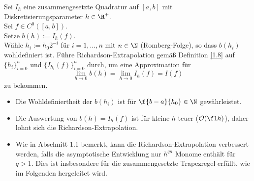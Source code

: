 \documentclass[11pt]{scrbook}
\begin{document}
\begin{df}
	\label{2.33}
	Sei $I_h$ eine zusammengesetzte Quadratur auf $[a,b]$ mit Diskretisierungsparameter $h\in \R^+$.  \\
	Sei $f\in C^0([a,b])$. \\
	Setze $b(h) := I_h(f)$. \\
	Wähle $h_i := h_0 2^{-i}$ für $i=1,\dotsc,n$ mit $n\in \N$ (Romberg-Folge), so dass $b(h_i)$ wohldefiniert ist.
	Führe Richardson-Extrapolation gemäß Definition \ref{1.8} auf $\{h_i\}_{i=0}^n$ und $\{I_{h_i}(f)\}_{i=0}^n$ durch, um eine Approximation für
	\[
		\lim_{h\to 0} b(h) = \lim_{h\to 0} I_h(f) = I(f)
	\]
	zu bekommen. 
	
	\begin{note}
		\begin{itemize}
			\item
				Die Wohldefiniertheit der $b(h_i)$ ist für $\f{b-a}{h_0} \in \N$ gewährleistet.
			\item
				Die Auswertung von $b(h) = I_h(f)$ ist für kleine $h$ teuer ($\mathcal O(\f 1h)$), daher lohnt sich die Richardson-Extrapolation.
			\item
				Wie in Abschnitt 1.1 bemerkt, kann die Richardson-Extrapolation verbessert werden, falls die asymptotische Entwicklung nur $h^{qn}$ Monome enthält für $q>1$.
				Dies ist insbesondere für die zusammengesetzte Trapezregel erfüllt, wie im Folgenden hergeleitet wird.
		\end{itemize}
	\end{note}
\end{df}
\end{document}

